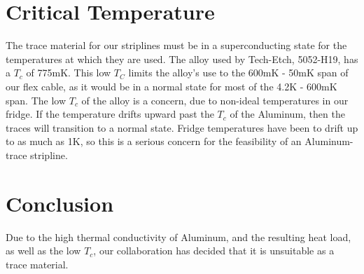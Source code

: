 \documentclass{report}
\begin{document}
\section{Critical Temperature}

The trace material for our striplines must be in a superconducting state for the temperatures at which they are used. The alloy used by Tech-Etch, 5052-H19, has a $T_{c}$ of 775mK. This low $T_{C}$ limits the alloy's use to the 600mK - 50mK span of our flex cable, as it would be in a normal state for most of the 4.2K - 600mK span. The low $T_{c}$ of the alloy is a concern, due to non-ideal temperatures in our fridge. If the temperature drifts upward past the $T_{c}$ of the Aluminum, then the traces will transition to a normal state. Fridge temperatures have been to drift up to as much as 1K, so this is a serious concern for the feasibility of an Aluminum-trace stripline.

\section{Conclusion}

Due to the high thermal conductivity of Aluminum, and the resulting heat load, as well as the low $T_{c}$, our collaboration has decided that it is unsuitable as a trace material.


\newpage

\end{document}
